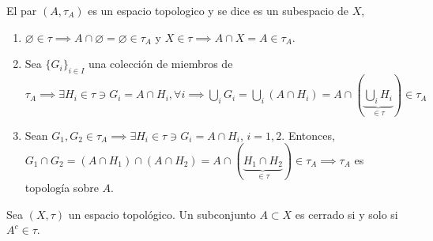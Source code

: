 \begin{definicion}
    El par $(A,\tau_A)$ es un espacio topologico y se dice es un subespacio de $X$, 
    \begin{enumerate}
        \item $\varnothing\in \tau\implies A\cap \varnothing=\varnothing\in\tau_A$ y $X\in \tau\implies A\cap X=A\in \tau_A$.
        \item Sea $\{G_i\}_{i\in I}$ una colección de miembros de $\tau_A\implies \exists H_i\in \tau\ni G_i=A\cap H_i, \forall i\implies \bigcup_i G_i=\bigcup_i(A\cap H_i)= A\cap\left(\underbrace{\bigcup_{i}H_i}_{\in\tau}\right)\in\tau_A$
        \item Sean $G_1,G_2\in \tau_A\implies\exists H_i\in\tau\ni G_i=A\cap H_i$, $i=1,2$. Entonces, $G_1\cap G_2=(A\cap H_1)\cap (A\cap H_2)=A\cap (\underbrace{H_1\cap H_2}_{\in\tau})\in\tau_A\implies \tau_A$ es topología sobre $A$. 
    \end{enumerate}
\end{definicion}



\begin{definicion}
    Sea $(X,\tau)$ un espacio topológico. Un subconjunto $A\subset X$ es cerrado si y solo si $A^c\in\tau $.
\end{definicion}




